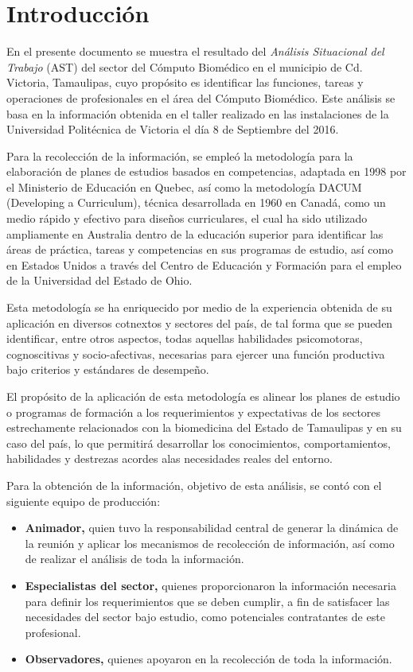 \chapter{Introducción}
\label{chap:introduccion}
En el presente documento se muestra el resultado del \emph{Análisis Situacional del Trabajo} (AST) del sector del 
Cómputo Biomédico en el municipio de Cd. Victoria, Tamaulipas, cuyo propósito es identificar las funciones, tareas y operaciones de profesionales en el área del Cómputo Biomédico. Este análisis se basa en la información obtenida en el taller realizado en las instalaciones de la Universidad Politécnica de Victoria el día 8 de Septiembre del 2016.

Para la recolección de la información, se empleó la metodología para la elaboración de planes de estudios basados en competencias, adaptada en 1998 por el Ministerio de Educación en Quebec, así como la metodología DACUM (Developing a Curriculum), técnica desarrollada en 1960 en Canadá, como un medio rápido y efectivo para diseños curriculares, el cual ha sido utilizado ampliamente en Australia dentro de la educación superior para identificar las áreas de práctica, tareas y competencias en sus programas de estudio, así como en Estados Unidos a través del Centro de Educación y Formación para el empleo de la Universidad del Estado de Ohio.

Esta metodología se ha enriquecido por medio de la experiencia obtenida de su aplicación en diversos cotnextos y sectores del país, de tal forma que se pueden identificar, entre otros aspectos, todas aquellas habilidades psicomotoras, cognoscitivas y socio-afectivas, necesarias para ejercer una función productiva bajo criterios y estándares de desempeño.

El propósito de la aplicación de esta metodología es alinear los planes de estudio o programas de formación a los requerimientos y expectativas de los sectores estrechamente relacionados con la biomedicina del Estado de Tamaulipas y en su caso del país, lo que permitirá desarrollar los conocimientos, comportamientos, habilidades y destrezas acordes alas necesidades reales del entorno.

Para la obtención de la información, objetivo de esta análisis, se contó con el siguiente equipo de producción:

\begin{itemize}
	\item \textbf{Animador,} quien tuvo la responsabilidad central de generar la dinámica de la reunión y aplicar los mecanismos de recolección de información, así como de realizar el análisis de toda la información.
	
	\item \textbf{Especialistas del sector,} quienes proporcionaron la información necesaria para definir los requerimientos que se deben cumplir, a fin de satisfacer las necesidades del sector bajo estudio, como potenciales contratantes de este profesional.
	
	\item \textbf{Observadores, } quienes apoyaron en la recolección de toda la información.
\end{itemize}

